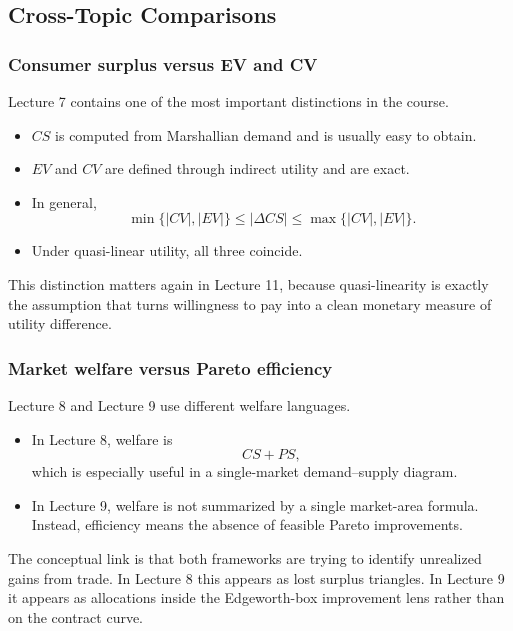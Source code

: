 \subsection{Cross-Topic Comparisons}

\subsubsection{Consumer surplus versus EV and CV}

Lecture 7 contains one of the most important distinctions in the course.

\begin{itemize}
    \item \(CS\) is computed from Marshallian demand and is usually easy to obtain.
    \item \(EV\) and \(CV\) are defined through indirect utility and are exact.
    \item In general,
    \[
    \min\{|CV|,|EV|\} \le |\Delta CS| \le \max\{|CV|,|EV|\}.
    \]
    \item Under quasi-linear utility, all three coincide.
\end{itemize}

This distinction matters again in Lecture 11, because quasi-linearity is exactly the assumption that turns willingness to pay into a clean monetary measure of utility difference.

\subsubsection{Market welfare versus Pareto efficiency}

Lecture 8 and Lecture 9 use different welfare languages.

\begin{itemize}
    \item In Lecture 8, welfare is
    \[
    CS+PS,
    \]
    which is especially useful in a single-market demand--supply diagram.
    \item In Lecture 9, welfare is not summarized by a single market-area formula. Instead, efficiency means the absence of feasible Pareto improvements.
\end{itemize}

The conceptual link is that both frameworks are trying to identify unrealized gains from trade. In Lecture 8 this appears as lost surplus triangles. In Lecture 9 it appears as allocations inside the Edgeworth-box improvement lens rather than on the contract curve.

